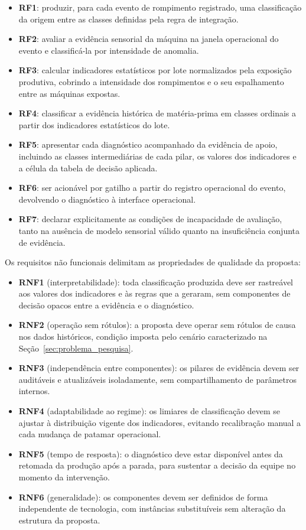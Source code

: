 \begin{itemize}
    \item \textbf{RF1}: produzir, para cada evento de rompimento registrado, uma classificação da origem entre as classes definidas pela regra de integração.
    \item \textbf{RF2}: avaliar a evidência sensorial da máquina na janela operacional do evento e classificá-la por intensidade de anomalia.
    \item \textbf{RF3}: calcular indicadores estatísticos por lote normalizados pela exposição produtiva, cobrindo a intensidade dos rompimentos e o seu espalhamento entre as máquinas expostas.
    \item \textbf{RF4}: classificar a evidência histórica de matéria-prima em classes ordinais a partir dos indicadores estatísticos do lote.
    \item \textbf{RF5}: apresentar cada diagnóstico acompanhado da evidência de apoio, incluindo as classes intermediárias de cada pilar, os valores dos indicadores e a célula da tabela de decisão aplicada.
    \item \textbf{RF6}: ser acionável por gatilho a partir do registro operacional do evento, devolvendo o diagnóstico à interface operacional.
    \item \textbf{RF7}: declarar explicitamente as condições de incapacidade de avaliação, tanto na ausência de modelo sensorial válido quanto na insuficiência conjunta de evidência.
\end{itemize}

Os requisitos não funcionais delimitam as propriedades de qualidade da proposta:

\begin{itemize}
    \item \textbf{RNF1} (interpretabilidade): toda classificação produzida deve ser rastreável aos valores dos indicadores e às regras que a geraram, sem componentes de decisão opacos entre a evidência e o diagnóstico.
    \item \textbf{RNF2} (operação sem rótulos): a proposta deve operar sem rótulos de causa nos dados históricos, condição imposta pelo cenário caracterizado na Seção~\ref{sec:problema_pesquisa}.
    \item \textbf{RNF3} (independência entre componentes): os pilares de evidência devem ser auditáveis e atualizáveis isoladamente, sem compartilhamento de parâmetros internos.
    \item \textbf{RNF4} (adaptabilidade ao regime): os limiares de classificação devem se ajustar à distribuição vigente dos indicadores, evitando recalibração manual a cada mudança de patamar operacional.
    \item \textbf{RNF5} (tempo de resposta): o diagnóstico deve estar disponível antes da retomada da produção após a parada, para sustentar a decisão da equipe no momento da intervenção.
    \item \textbf{RNF6} (generalidade): os componentes devem ser definidos de forma independente de tecnologia, com instâncias substituíveis sem alteração da estrutura da proposta.
\end{itemize}


